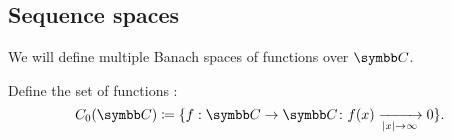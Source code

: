 \subsection{Sequence spaces}\label{subsec:sequence_spaces}

\begin{definition}\label{def:function_spaces}
  We will define multiple Banach spaces of functions over \( \Co \).

  \begin{defenum}
     Define the set of functions :
    \begin{equation*}
      C_0(\Co) \coloneqq \{ f: \Co \to \Co \colon f(x) \xrightarrow[\Abs{x} \to \infty]{} 0 \}.
    \end{equation*}
  \end{defenum}
\end{definition}
